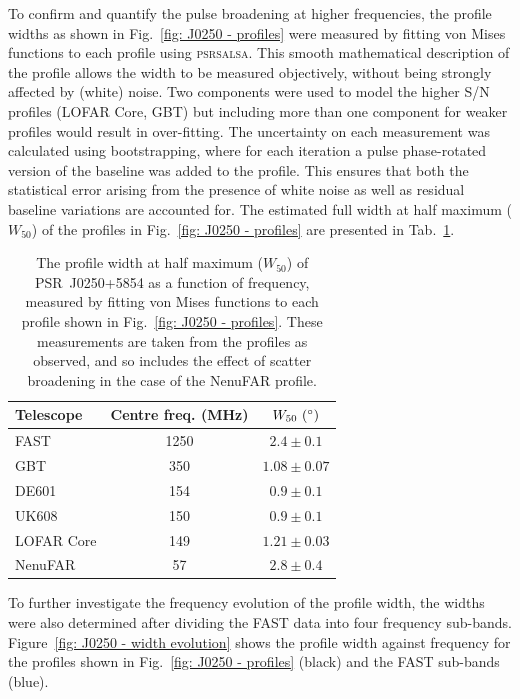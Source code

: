 To confirm and quantify the pulse broadening at higher frequencies, the profile widths as shown in Fig.~\ref{fig: J0250 - profiles} were measured by fitting von Mises functions to each profile using \textsc{psrsalsa}. This smooth mathematical description of the profile allows the width to be measured objectively, without being strongly affected by (white) noise. Two components were used to model the higher S/N profiles (LOFAR Core, GBT) but including more than one component for weaker profiles would result in over-fitting. The uncertainty on each measurement was calculated using bootstrapping, where for each iteration a pulse phase-rotated version of the baseline was added to the profile. This ensures that both the statistical error arising from the presence of white noise as well as residual baseline variations are accounted for. The estimated full width at half maximum ($W_{50}$) of the profiles in Fig.~\ref{fig: J0250 - profiles} are presented in Tab.~\ref{tab: J0250 - W50}.
\begin{table}
    \centering
    \caption[The measured profile widths of PSR~J0250+5854 across the observed frequency range]{The profile width at half maximum ($W_{50}$) of PSR~J0250+5854 as a function of frequency, measured by fitting von Mises functions to each profile shown in Fig.~\ref{fig: J0250 - profiles}. These measurements are taken from the profiles as observed, and so includes the effect of scatter broadening in the case of the NenuFAR profile.}
    \label{tab: J0250 - W50}
    \begin{tabular}{lcc}
        \hline
        Telescope & Centre freq. (MHz) & $W_{50}~(^\circ)$ \\
        \hline
        FAST & 1250 & $2.4\pm0.1$ \\
        GBT & 350 & $1.08\pm0.07$ \\
        DE601 & 154 & $0.9\pm0.1$ \\
        UK608 & 150 & $0.9\pm0.1$ \\
        LOFAR Core & 149 & $1.21\pm0.03$ \\
        NenuFAR & 57 & $2.8\pm0.4$ \\ 
    \end{tabular}
\end{table}
To further investigate the frequency evolution of the profile width, the widths were also determined after dividing the FAST data into four frequency sub-bands. Figure~\ref{fig: J0250 - width evolution} shows the profile width against frequency for the profiles shown in Fig.~\ref{fig: J0250 - profiles} (black) and the FAST sub-bands (blue).

